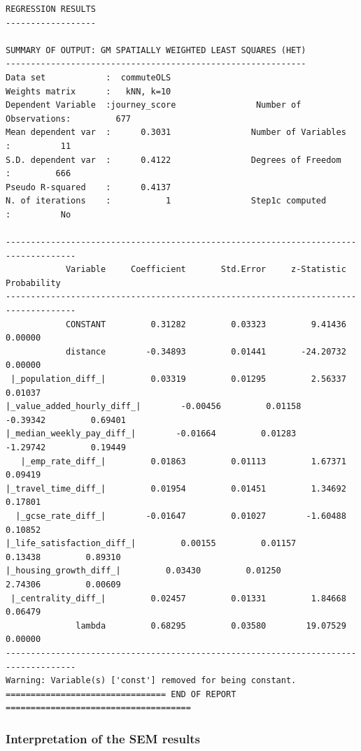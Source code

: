 \documentclass[
  number]{elsarticle}
\begin{document}
\begin{verbatim}
REGRESSION RESULTS
------------------

SUMMARY OF OUTPUT: GM SPATIALLY WEIGHTED LEAST SQUARES (HET)
------------------------------------------------------------
Data set            :  commuteOLS
Weights matrix      :   kNN, k=10
Dependent Variable  :journey_score                Number of Observations:         677
Mean dependent var  :      0.3031                Number of Variables   :          11
S.D. dependent var  :      0.4122                Degrees of Freedom    :         666
Pseudo R-squared    :      0.4137
N. of iterations    :           1                Step1c computed       :          No

------------------------------------------------------------------------------------
            Variable     Coefficient       Std.Error     z-Statistic     Probability
------------------------------------------------------------------------------------
            CONSTANT         0.31282         0.03323         9.41436         0.00000
            distance        -0.34893         0.01441       -24.20732         0.00000
 |_population_diff_|         0.03319         0.01295         2.56337         0.01037
|_value_added_hourly_diff_|        -0.00456         0.01158        -0.39342         0.69401
|_median_weekly_pay_diff_|        -0.01664         0.01283        -1.29742         0.19449
   |_emp_rate_diff_|         0.01863         0.01113         1.67371         0.09419
|_travel_time_diff_|         0.01954         0.01451         1.34692         0.17801
  |_gcse_rate_diff_|        -0.01647         0.01027        -1.60488         0.10852
|_life_satisfaction_diff_|         0.00155         0.01157         0.13438         0.89310
|_housing_growth_diff_|         0.03430         0.01250         2.74306         0.00609
 |_centrality_diff_|         0.02457         0.01331         1.84668         0.06479
              lambda         0.68295         0.03580        19.07529         0.00000
------------------------------------------------------------------------------------
Warning: Variable(s) ['const'] removed for being constant.
================================ END OF REPORT =====================================
\end{verbatim}

\subsubsection{Interpretation of the SEM
results}\label{sec-interpretation-sem}
\end{document}

